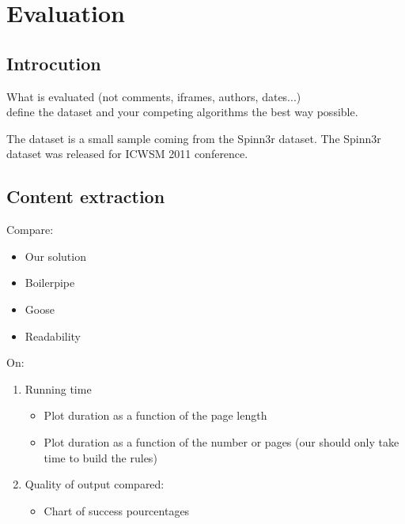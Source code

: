 \section{Evaluation}

\subsection{Introcution}
What is evaluated (not comments, iframes, authors, dates...)
\\ define the dataset and your competing algorithms the best way possible.

The dataset is a small sample coming from the Spinn3r dataset. The Spinn3r dataset was released for ICWSM 2011 conference.

\subsection{Content extraction}
Compare:
\begin{itemize}
  \item Our solution
  \item Boilerpipe 
  \item Goose 
  \item Readability 
\end{itemize}
On:
\begin{enumerate}
  \item Running time
  \begin{itemize}
    \item Plot duration as a function of the page length
    \item Plot duration as a function of the number or pages (our should only take time to build the rules)
  \end{itemize}
  \item Quality of output compared:
  \begin{itemize}
    \item Chart of success pourcentages
  \end{itemize}
\end{enumerate}

